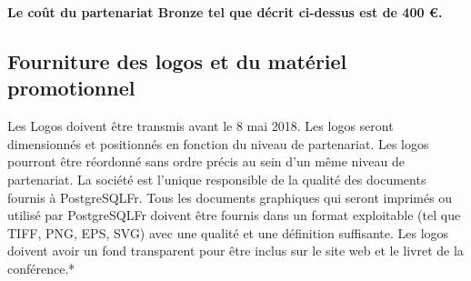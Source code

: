 \documentclass[]{article}
\begin{document}
\textbf{Le coût du partenariat Bronze tel que décrit ci-dessus est de
400 €.}

\hypertarget{fourniture-des-logos-et-du-matuxe9riel-promotionnel}{%
\subsection{Fourniture des logos et du matériel
promotionnel}\label{fourniture-des-logos-et-du-matuxe9riel-promotionnel}}

Les Logos doivent être transmis avant le 8 mai 2018. Les logos seront
dimensionnés et positionnés en fonction du niveau de partenariat. Les
logos pourront être réordonné sans ordre précis au sein d'un même niveau
de partenariat. La société est l'unique responsible de la qualité des
documents fournis à PostgreSQLFr. Tous les documents graphiques qui
seront imprimés ou utilisé par PostgreSQLFr doivent être fournis dans un
format exploitable (tel que TIFF, PNG, EPS, SVG) avec une qualité et une
définition suffisante. Les logos doivent avoir un fond transparent pour
être inclus sur le site web et le livret de la conférence.*
\end{document}
